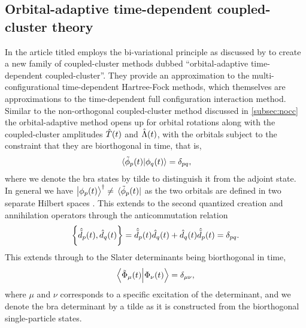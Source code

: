         \subsection{Orbital-adaptive time-dependent coupled-cluster theory}
            In the article titled 
            \citeauthor{kvaal2012ab} \cite{kvaal2012ab} employs the
            bi-variational principle as discussed by \citeauthor{arponen1983311}
            \cite{arponen1983311} to create a new family of coupled-cluster
            methods dubbed ``orbital-adaptive time-dependent
            coupled-cluster''.
            They provide an approximation to the multi-configurational
            time-dependent Hartree-Fock methods, which themselves are
            approximations to the time-dependent full configuration interaction
            method.
            Similar to the non-orthogonal coupled-cluster method discussed in
            \autoref{subsec:nocc} the orbital-adaptive method opens up for
            orbital rotations along with the coupled-cluster amplitudes
            $\hat{T}(t)$ and $\hat{\Lambda}(t)$, with the orbitals subject to the
            constraint that they are biorthogonal in time, that is,
            \begin{align}
                \braket*{\tilde{\phi}_p(t)}{\phi_q(t)} = \delta_{pq},
            \end{align}
            where we denote the bra states by tilde to distinguish it from the
            adjoint state.
            In general we have $\ket{\phi_p(t)}^{\dagger} \neq
            \bra*{\tilde{\phi}_p(t)}$ as the two orbitals are defined in two
            separate Hilbert spaces \cite{kvaal2012ab}.
            This extends to the second quantized creation and annihilation
            operators through the anticommutation relation
            \begin{align}
                \left\{\hat{\tilde{d}}_{p}(t), \hat{d}_{q}(t)\right\}
                = \hat{\tilde{d}}_{p}(t)\hat{d}_{q}(t)
                + \hat{d}_{q}(t)\hat{\tilde{d}}_{p}(t)
                = \delta_{pq}.
            \end{align}
            This extends through to the Slater determinants being biorthogonal
            in time,
            \begin{align}
                \braket{\tilde{\Phi}_{\mu}(t)}{\Phi_{\nu}(t)}
                = \delta_{\mu\nu},
            \end{align}
            where $\mu$ and $\nu$ corresponds to a specific excitation of the
            determinant, and we denote the bra determinant by a tilde as it is
            constructed from the biorthogonal single-particle states.

